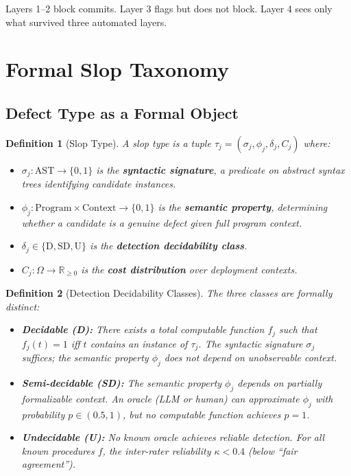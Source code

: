 \documentclass[11pt, a4paper, logo, copyright]{googledeepmind}
\newtheorem{definition}{Definition}[section]
\begin{document}
Layers 1--2 block commits. Layer 3 flags but does not block. Layer 4 sees only what survived three automated layers.


\section{Formal Slop Taxonomy}
\label{sec:taxonomy}

\subsection{Defect Type as a Formal Object}

\begin{definition}[Slop Type]
\label{def:sloptype}
A slop type is a tuple $\tau_j = (\sigma_j, \phi_j, \delta_j, C_j)$ where:
\begin{itemize}
\item $\sigma_j : \mathrm{AST} \to \{0, 1\}$ is the \textbf{syntactic signature}, a predicate on abstract syntax trees identifying candidate instances.
\item $\phi_j : \mathrm{Program} \times \mathrm{Context} \to \{0, 1\}$ is the \textbf{semantic property}, determining whether a candidate is a genuine defect given full program context.
\item $\delta_j \in \{\mathrm{D}, \mathrm{SD}, \mathrm{U}\}$ is the \textbf{detection decidability class}.
\item $C_j : \Omega \to \mathbb{R}_{\geq 0}$ is the \textbf{cost distribution} over deployment contexts.
\end{itemize}
\end{definition}

\begin{definition}[Detection Decidability Classes]
\label{def:decidability}
The three classes are formally distinct:
\begin{itemize}
\item \textbf{Decidable (D):} There exists a total computable function $f_j$ such that $f_j(t) = 1$ iff $t$ contains an instance of $\tau_j$. The syntactic signature $\sigma_j$ suffices; the semantic property $\phi_j$ does not depend on unobservable context.

\item \textbf{Semi-decidable (SD):} The semantic property $\phi_j$ depends on partially formalizable context. An oracle (LLM or human) can approximate $\phi_j$ with probability $p \in (0.5, 1)$, but no computable function achieves $p = 1$.

\item \textbf{Undecidable (U):} No known oracle achieves reliable detection. For all known procedures $f$, the inter-rater reliability $\kappa < 0.4$ (below ``fair agreement'').
\end{itemize}
\end{definition}
\end{document}
